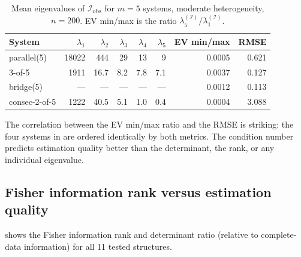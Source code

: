 \documentclass[12pt]{article}
\theoremstyle{definition}
\theoremstyle{remark}
\begin{document}
\begin{table}[htbp]
  \centering
  \caption{Mean eigenvalues of $\mathcal{I}_{\mathrm{obs}}$ for
    $m = 5$ systems, moderate heterogeneity, $n = 200$.
    EV min/max is the ratio
    $\lambda_5^{(\mathcal{I})} / \lambda_1^{(\mathcal{I})}$.}
  \label{tab:eigenvalues}
  \begin{tabular}{lrrrrrrr}
    \toprule
    System & $\lambda_1$ & $\lambda_2$ & $\lambda_3$ & $\lambda_4$ & $\lambda_5$
           & EV min/max & RMSE \\
    \midrule
    parallel(5)   & 18022 & 444 & 29  & 13  & 9   & 0.0005 & 0.621 \\
    3-of-5        & 1911  & 16.7 & 8.2 & 7.8 & 7.1 & 0.0037 & 0.127 \\
    bridge(5)     & ---   & ---  & --- & --- & --- & 0.0012 & 0.113 \\
    consec-2-of-5 & 1222  & 40.5 & 5.1 & 1.0 & 0.4 & 0.0004 & 3.088 \\
    \bottomrule
  \end{tabular}
\end{table}

The correlation between the EV min/max ratio and the RMSE is
striking: the four systems in  are ordered
identically by both metrics.  The condition number predicts estimation
quality better than the determinant, the rank, or any individual
eigenvalue.


\subsection{Fisher information rank versus estimation quality}
\label{sec:res_rank}

 shows the Fisher information rank and
determinant ratio (relative to complete-data information) for all 11
tested structures.
\end{document}
